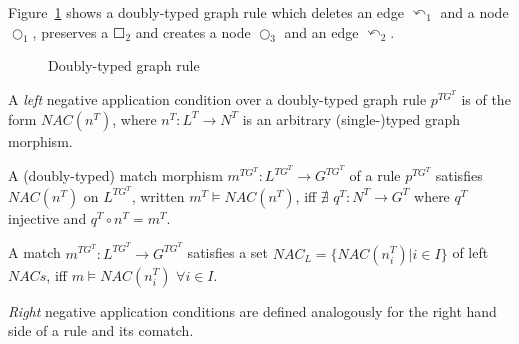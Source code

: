 \begin{example}Figure~\ref{fig:process:doubly-typed-graph-rule} shows a doubly-typed graph rule which deletes an edge $\curvearrowleft_1$ and a node $\Circle_1$, preserves a $\Square_2$ and creates a node $\Circle_3$ and an edge $\curvearrowleft_2$.

\begin{figure}[!ht]
  \centering
  \caption{Doubly-typed graph rule}\label{fig:process:doubly-typed-graph-rule}
\end{figure}
\end{example}

\begin{definition} A \emph{left} negative application condition over a doubly-typed graph rule $p^{TG^T}$ is of the form $NAC(n^T)$, where $n^T : L^T \rightarrow N^T$ is an arbitrary (single-)typed graph morphism. 
 
A (doubly-typed) match morphism $m^{TG^T} : L^{TG^T} \rightarrow G^{TG^T}$ of a rule $p^{TG^T}$ satisfies $NAC(n^T)$ on $L^{TG^T}$, written \mbox{$m^T \models NAC(n^T)$}, iff $\nexists$ $q^T : N^T \rightarrow G^T$ where $q^T$ injective and $q^T \circ n^T = m^T$.


  A match $m^{TG^T} : L^{TG^T} \rightarrow G^{TG^T}$ satisfies a set \mbox{$NAC_L = \{NAC\left(n^T_i\right)|i \in I\}$} of left $NACs$, iff \mbox{$m \models NAC\left(n^T_i\right)$} $\forall i \in I$.

\emph{Right} negative application conditions are defined analogously for the right hand side of a rule and its comatch.
\end{definition}

